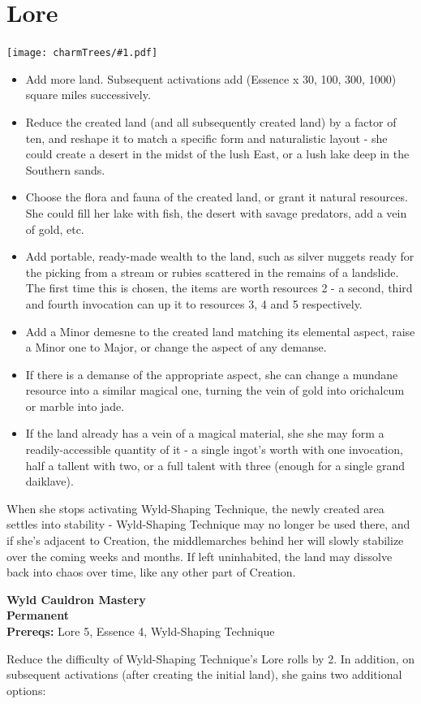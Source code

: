 \documentclass[oneside]{book}
\newcommand{\permanentCharm}[2]{
  \parbox{\linewidth}{
    \par \textbf{\color{MidnightBlue}#1} \\
    \textbf {Permanent} \\
    \textbf {Prereqs:} #2
  }
  \par
}
\newenvironment{Ability}[1]{%
  \section{#1}%
  \vspace{-0.25in}\hspace*{-0.75in}\texttt{[image: charmTrees/\#1.pdf]}%
  \begin{multicols}{2}
}
{
  \end{multicols}
}
\begin{document}
\begin{Ability}{Lore}
  \begin{itemize}
    \item Add more land. Subsequent activations add (Essence x 30, 100, 300, 1000) square miles successively.
    \item Reduce the created land (and all subsequently created land) by a factor of ten, and reshape it to match a specific form and naturalistic layout - she could create a desert in the midst of the lush East, or a lush lake deep in the Southern sands.
    \item Choose the flora and fauna of the created land, or grant it natural resources. She could fill her lake with fish, the desert with savage predators, add a vein of gold, etc.
    \item Add portable, ready-made wealth to the land, such as silver nuggets ready for the picking from a stream or rubies scattered in the remains of a landslide. The first time this is chosen, the items are worth resources 2 - a second, third and fourth invocation can up it to resources 3, 4 and 5 respectively.
    \item Add a Minor demesne to the created land matching its elemental aspect, raise a Minor one to Major, or change the aspect of any demanse.
    \item If there is a demanse of the appropriate aspect, she can change a mundane resource into a similar magical one, turning the vein of gold into orichalcum or marble into jade.
    \item If the land already has a vein of a magical material, she she may form a readily-accessible quantity of it - a single ingot's worth with one invocation, half a tallent with two, or a full talent with three (enough for a single grand daiklave).
  \end{itemize}

  When she stops activating Wyld-Shaping Technique, the newly created area settles into stability - Wyld-Shaping Technique may no longer be used there, and if she's adjacent to Creation, the middlemarches behind her will slowly stabilize over the coming weeks and months. If left uninhabited, the land may dissolve back into chaos over time, like any other part of Creation.

  \permanentCharm{Wyld Cauldron Mastery}
  {Lore 5, Essence 4, Wyld-Shaping Technique}
  Reduce the difficulty of Wyld-Shaping Technique's Lore rolls by 2. In addition, on subsequent activations (after creating the initial land), she gains two additional options:


\end{Ability}
\end{document}
